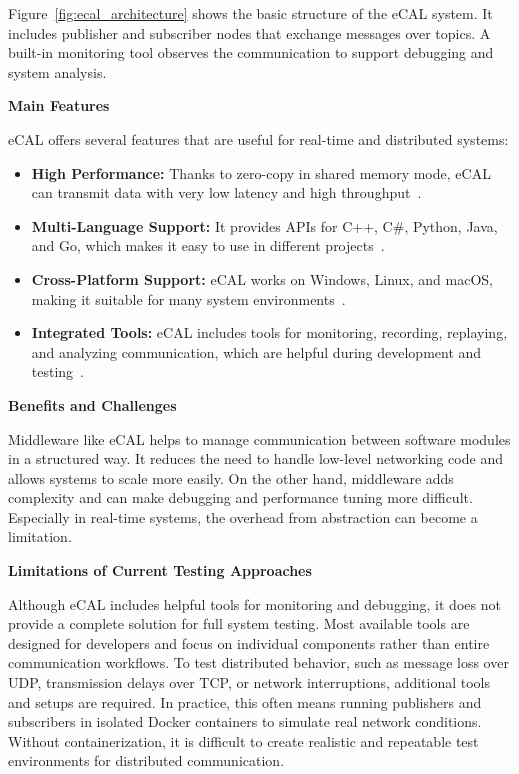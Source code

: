 \newpage
Figure~\ref{fig:ecal_architecture} shows the basic structure of the eCAL system. It includes publisher and subscriber nodes that exchange messages over topics. A built-in monitoring tool observes the communication to support debugging and system analysis.

\vspace{1.2em}
\textbf{Main Features}

\vspace{0.4em}
eCAL offers several features that are useful for real-time and distributed systems:

\begin{itemize}
	\item \textbf{High Performance:} Thanks to zero-copy in shared memory mode, eCAL can transmit data with very low latency and high throughput~\cite{ecal_github,ecal_official_docs}.
	
	\item \textbf{Multi-Language Support:} It provides APIs for C++, C\#, Python, Java, and Go, which makes it easy to use in different projects~\cite{ecal_official_docs}.
	
	\item \textbf{Cross-Platform Support:} eCAL works on Windows, Linux, and macOS, making it suitable for many system environments~\cite{ecal_official_docs}.
	
	\item \textbf{Integrated Tools:} eCAL includes tools for monitoring, recording, replaying, and analyzing communication, which are helpful during development and testing~\cite{ecal_github,ecal_official_docs}.
\end{itemize}

\vspace{1.2em}
\textbf{Benefits and Challenges}

\vspace{0.4em}
Middleware like eCAL helps to manage communication between software modules in a structured way. It reduces the need to handle low-level networking code and allows systems to scale more easily. On the other hand, middleware adds complexity and can make debugging and performance tuning more difficult. Especially in real-time systems, the overhead from abstraction can become a limitation.

\vspace{1em}
\textbf{Limitations of Current Testing Approaches}

\vspace{0.4em}
Although eCAL includes helpful tools for monitoring and debugging, it does not provide a complete solution for full system testing. Most available tools are designed for developers and focus on individual components rather than entire communication workflows. To test distributed behavior, such as message loss over UDP, transmission delays over TCP, or network interruptions, additional tools and setups are required. In practice, this often means running publishers and subscribers in isolated Docker containers to simulate real network conditions. Without containerization, it is difficult to create realistic and repeatable test environments for distributed communication.


